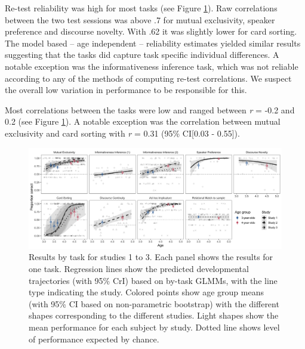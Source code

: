 \documentclass[
  english,
  man,floatsintext]{apa6}
\begin{document}
Re-test reliability was high for most tasks (see Figure \ref{fig:fig2}). Raw correlations between the two test sessions was above .7 for mutual exclusivity, speaker preference and discourse novelty. With .62 it was slightly lower for card sorting. The model based -- age independent -- reliability estimates yielded similar results suggesting that the tasks did capture task specific individual differences. A notable exception was the informativeness inference task, which was not reliable according to any of the methods of computing re-test correlations. We suspect the overall low variation in performance to be responsible for this.

Most correlations between the tasks were low and ranged between \emph{r} = -0.2 and 0.2 (see Figure \ref{fig:fig2}). A notable exception was the correlation between mutual exclusivity and card sorting with \emph{r} = 0.31 (95\% CI{[}0.03 - 0.55{]}).



\begin{figure}

{\centering \includegraphics[width=1\linewidth]{./figures/figure2} 

}

\caption{Results by task for studies 1 to 3. Each panel shows the results for one task. Regression lines show the predicted developmental trajectories (with 95\% CrI) based on by-task GLMMs, with the line type indicating the study. Colored points show age group means (with 95\% CI based on non-parametric bootstrap) with the different shapes corresponding to the different studies. Light shapes show the mean performance for each subject by study. Dotted line shows level of performance expected by chance.}\label{fig:fig2}
\end{figure}
\end{document}
